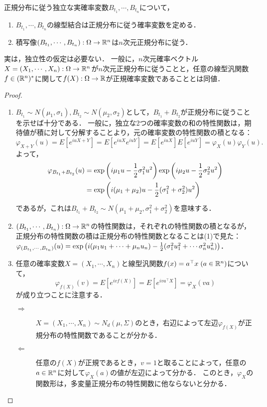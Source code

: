 \documentclass[uplatex,dvipdfmx]{jsreport}
\begin{document}
\begin{lemma}[高次元正規分布の特徴付け]
    正規分布に従う独立な実確率変数$B_{t_1},\cdots,B_{t_n}$について，
    \begin{enumerate}
        \item $B_{t_1},\cdots,B_{t_n}$の線型結合は正規分布に従う確率変数を定める．
        \item 積写像$(B_{t_1},\cdots,B_{t_n}):\Omega\to\mathbb{R}^n$は$n$次元正規分布に従う．
    \end{enumerate}
    実は，独立性の仮定は必要ない．
    一般に，$n$次元確率ベクトル$X=(X_1,\cdots,X_n):\Omega\to\mathbb{R}^n$が$n$次元正規分布に従うことと，任意の線型汎関数$f\in(\mathbb{R}^n)^*$に関して$f(X):\Omega\to\mathbb{R}$が正規確率変数であることとは同値．
\end{lemma}
\begin{proof}\mbox{}
    \begin{enumerate}
        \item $B_{t_1}\sim N(\mu_1,\sigma_1),B_{t_2}\sim N(\mu_2,\sigma_2)$として，$B_{t_1}+B_{t_2}$が正規分布に従うことを示せば十分である．
        一般に，独立な2つの確率変数の和の特性関数は，期待値が積に対して分解することより，元の確率変数の特性関数の積となる：\[\varphi_{X+Y}(u)=E[e^{iuX+Y}]=E[e^{iuX}e^{iuY}]=E[e^{iuX}]E[e^{iuY}]=\varphi_X(u)\varphi_Y(u).\]
        よって，
        \begin{align*}
            \varphi_{B_{t_1}+B_{t_2}}(u)&=\exp\left(i\mu_1u-\frac{1}{2}\sigma_1^2u^2\right)\exp\left(i\mu_2u-\frac{1}{2}\sigma^2_2u^2\right)\\
            &=\exp\left(i(\mu_1+\mu_2)u-\frac{1}{2}(\sigma^2_1+\sigma^2_2)u^2\right)
        \end{align*}
        であるが，これは$B_{t_1}+B_{t_2}\sim N(\mu_1+\mu_2,\sigma^2_1+\sigma^2_2)$を意味する．
        \item $(B_{t_1},\cdots,B_{t_n}):\Omega\to\mathbb{R}^n$の特性関数は，それぞれの特性関数の積となるが，正規分布の特性関数の積は正規分布の特性関数となることは(1)で見た：$\varphi_{(B_{t_1},\cdots,B_{t_n})}(u)=\exp\left(i(\mu_1u_1+\cdots+\mu_nu_n)-\frac{1}{2}(\sigma_1^2u_1^2+\cdots\sigma_n^2u_n^2)\right)$．
        \item 任意の確率変数$X=(X_1,\cdots,X_n)$と線型汎関数$f(x)=a^\top x\;(a\in\mathbb{R}^n)$について，
        \[\varphi_{f(X)}(v)=E[e^{ivf(X)}]=E[e^{iva^\top X}]=\varphi_X(va)\]
        が成り立つことに注意する．
        \begin{description}
            \item[$\Rightarrow$] $X=(X_1,\cdots,X_n)\sim N_d(\mu,\Sigma)$のとき，右辺によって左辺$\varphi_{f(X)}$が正規分布の特性関数であることが分かる．
            \item[$\Leftarrow$] 任意の$f(X)$が正規であるとき，$v=1$と取ることによって，任意の$a\in\mathbb{R}^n$に対して$\varphi_X(a)$の値が左辺によって分かる．
            このとき，$\varphi_X$の関数形は，多変量正規分布の特性関数に他ならないと分かる．
        \end{description}
    \end{enumerate}
\end{proof}
\end{document}

